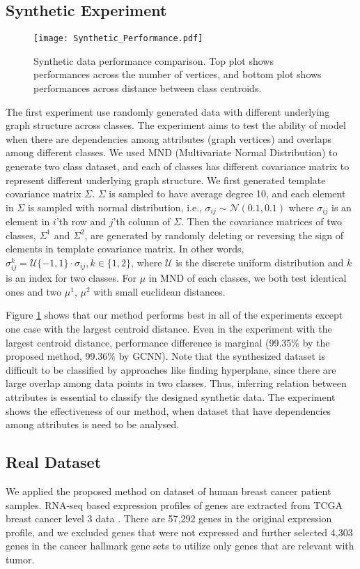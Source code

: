 \documentclass{article}
\begin{document}
\subsection{Synthetic Experiment}
\begin{figure}[!t]
\centering
\texttt{[image: Synthetic\_Performance.pdf]}
\caption{Synthetic data performance comparison. Top plot shows performances across the number of vertices, and bottom plot shows performances across distance between class centroids.}
\label{fig_synthetic}
\end{figure}

The first experiment use randomly generated data with different underlying graph structure across classes. The experiment aims to test the ability of model when there are dependencies among attributes (graph vertices) and overlaps among different classes. We used MND (Multivariate Normal Distribution) to generate two class dataset, and each of classes has different covariance matrix to represent different underlying graph structure. We first generated template covariance matrix $\Sigma$. $\Sigma$ is sampled to have average degree 10, and each element in $\Sigma$ is sampled with normal distribution, i.e., $\sigma_{ij} \sim \mathcal{N}(0.1, 0.1)$ where $\sigma_{ij}$ is an element in $i$'th row and $j$'th column of $\Sigma$. Then the covariance matrices of two classes, $\Sigma^1$ and $\Sigma^2$, are generated by randomly deleting or reversing the sign of elements in template covariance matrix. In other words, $\sigma_{ij}^k = \mathcal{U}\{-1,1\} \cdot \sigma_{ij}, k \in \{1,2\}$, where $\mathcal{U}$ is the discrete uniform distribution and $k$ is an index for two classes. For $\mu$ in MND of each classes, we both test identical ones and two $\mu^1$, $\mu^2$ with small euclidean distances.

Figure \ref{fig_synthetic} shows that our method performs best in all of the experiments except one case with the largest centroid distance. Even in the experiment with the largest centroid distance, performance difference is marginal (99.35\% by the proposed method, 99.36\% by GCNN). 
Note that the synthesized dataset is difficult to be classified by approaches like finding hyperplane, since there are large overlap among data points in two classes. Thus, inferring relation between attributes is essential to classify the designed synthetic data. The experiment shows the effectiveness of our method, when dataset that have dependencies among attributes is need to be analysed.


\subsection{Real Dataset}
We applied the proposed method on dataset of human breast cancer patient samples. RNA-seq based expression profiles of genes are extracted from TCGA breast cancer level 3 data \cite{prat2012comprehensive}.
There are 57,292 genes in the original expression profile, and we excluded genes that were not expressed and further selected 4,303 genes in the cancer hallmark gene sets  \cite{liberzon2015molecular} to utilize only genes that are relevant with tumor.
\end{document}
